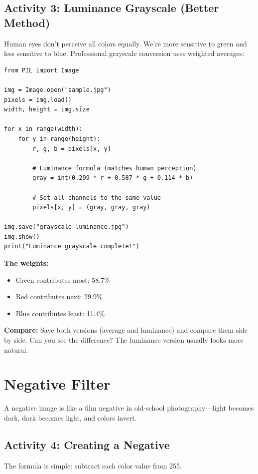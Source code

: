 \documentclass[11pt]{article}
\begin{document}
\subsection*{Activity 3: Luminance Grayscale (Better Method)}

Human eyes don't perceive all colors equally. We're more sensitive to green and less sensitive to blue. Professional grayscale conversion uses weighted averages:

\begin{lstlisting}
from PIL import Image

img = Image.open("sample.jpg")
pixels = img.load()
width, height = img.size

for x in range(width):
    for y in range(height):
        r, g, b = pixels[x, y]

        # Luminance formula (matches human perception)
        gray = int(0.299 * r + 0.587 * g + 0.114 * b)

        # Set all channels to the same value
        pixels[x, y] = (gray, gray, gray)

img.save("grayscale_luminance.jpg")
img.show()
print("Luminance grayscale complete!")
\end{lstlisting}

\textbf{The weights:}
\begin{itemize}
    \item Green contributes most: 58.7\%
    \item Red contributes next: 29.9\%
    \item Blue contributes least: 11.4\%
\end{itemize}

\textbf{Compare:} Save both versions (average and luminance) and compare them side by side. Can you see the difference? The luminance version usually looks more natural.

\section{Negative Filter}

A negative image is like a film negative in old-school photography—light becomes dark, dark becomes light, and colors invert.

\subsection*{Activity 4: Creating a Negative}

The formula is simple: subtract each color value from 255.
\end{document}
